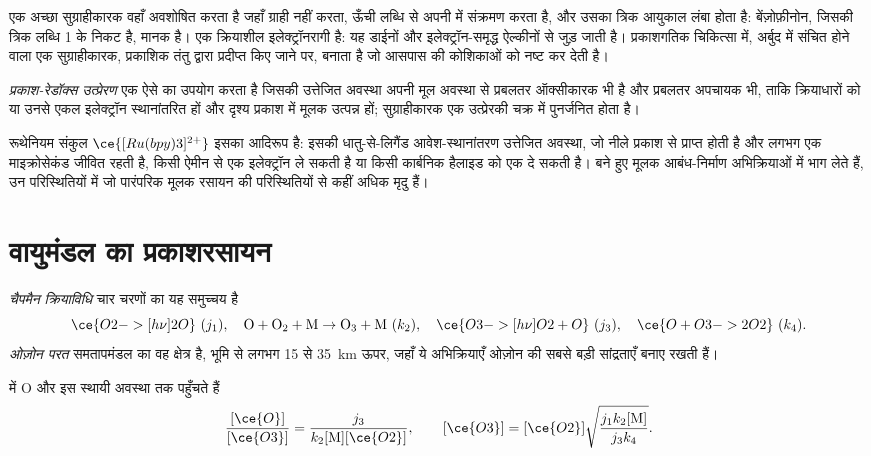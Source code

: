 एक अच्छा सुग्राहीकारक वहाँ अवशोषित करता है जहाँ ग्राही नहीं करता, ऊँची लब्धि से अपनी
 में संक्रमण करता है, और उसका त्रिक आयुकाल लंबा होता है: बेंज़ोफ़ीनोन,
जिसकी त्रिक लब्धि 1 के निकट है, मानक है।  एक क्रियाशील
इलेक्ट्रॉनरागी है: यह डाईनों और इलेक्ट्रॉन-समृद्ध ऐल्कीनों से जुड़ जाती है। प्रकाशगतिक
चिकित्सा में, अर्बुद में संचित होने वाला एक सुग्राहीकारक, प्रकाशिक तंतु द्वारा
प्रदीप्त किए जाने पर,  बनाता है जो आसपास की कोशिकाओं को नष्ट कर देती है।

\begin{definition}[प्रकाश-रेडॉक्स उत्प्रेरण]\label{def:b3:photochemistry:photoredox}
\emph{प्रकाश-रेडॉक्स उत्प्रेरण} एक ऐसे  का
उपयोग करता है जिसकी उत्तेजित अवस्था अपनी मूल अवस्था से प्रबलतर ऑक्सीकारक भी है और
प्रबलतर अपचायक भी, ताकि क्रियाधारों को या उनसे एकल इलेक्ट्रॉन स्थानांतरित हों और
दृश्य प्रकाश में मूलक उत्पन्न हों; सुग्राहीकारक एक उत्प्रेरकी
चक्र में पुनर्जनित होता है।
\end{definition}

रूथेनियम संकुल $\ce{[Ru(bpy)3]^{2+}}$ इसका आदिरूप है: इसकी धातु-से-लिगैंड आवेश-स्थानांतरण
उत्तेजित अवस्था, जो नीले प्रकाश से प्राप्त होती है और लगभग एक माइक्रोसेकंड
जीवित रहती है, किसी ऐमीन से एक इलेक्ट्रॉन ले सकती है या किसी कार्बनिक हैलाइड को एक दे सकती है।
बने हुए मूलक आबंध-निर्माण अभिक्रियाओं में भाग लेते हैं, उन परिस्थितियों में जो
पारंपरिक मूलक रसायन की परिस्थितियों से कहीं अधिक मृदु हैं।

\section{वायुमंडल का प्रकाशरसायन}

\begin{definition}[चैपमैन क्रियाविधि, ओज़ोन परत]\label{def:b3:photochemistry:chapman}
\emph{चैपमैन क्रियाविधि} चार चरणों का यह समुच्चय है
\[
  \ce{O2 ->[h\nu] 2 O}\ (j_1), \quad \mathrm{O + O_2 + M \to O_3 + M}\ (k_2), \quad
  \ce{O3 ->[h\nu] O2 + O}\ (j_3), \quad \ce{O + O3 -> 2 O2}\ (k_4).
\]
\emph{ओज़ोन परत} समतापमंडल का वह क्षेत्र है, भूमि से लगभग
15 से \qty{35}{km} ऊपर, जहाँ ये अभिक्रियाएँ ओज़ोन की सबसे बड़ी
सांद्रताएँ बनाए रखती हैं।
\end{definition}

\begin{theorem}[चैपमैन स्थायी अवस्था]\label{thm:b3:photochemistry:chapman}
 में O और  इस स्थायी अवस्था तक पहुँचते हैं
\[
  \frac{[\ce{O}]}{[\ce{O3}]} = \frac{j_3}{k_2[\mathrm M][\ce{O2}]}, \qquad
  [\ce{O3}] = [\ce{O2}]\sqrt{\frac{j_1k_2[\mathrm M]}{j_3k_4}} .
\]
\end{theorem}

